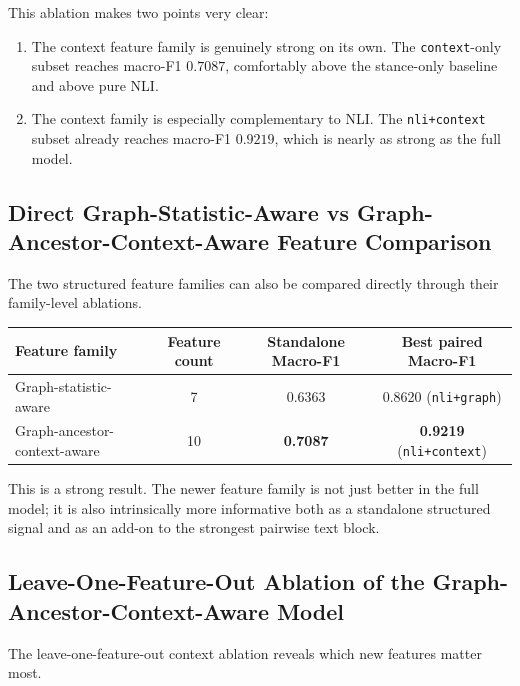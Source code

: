 \documentclass[11pt,a4paper]{article}
\begin{document}
This ablation makes two points very clear:
\begin{enumerate}[label=\arabic*.]
  \item The context feature family is genuinely strong on its own. The \texttt{context}-only subset reaches macro-F1 \(0.7087\), comfortably above the stance-only baseline and above pure NLI.
  \item The context family is especially complementary to NLI. The \texttt{nli+context} subset already reaches macro-F1 \(0.9219\), which is nearly as strong as the full model.
\end{enumerate}

\subsection{Direct Graph-Statistic-Aware vs Graph-Ancestor-Context-Aware Feature Comparison}
The two structured feature families can also be compared directly through their family-level ablations.

\begin{center}
\begin{tabular}{lccc}
\toprule
Feature family & Feature count & Standalone Macro-F1 & Best paired Macro-F1 \\
\midrule
Graph-statistic-aware & 7 & 0.6363 & 0.8620 (\texttt{nli+graph}) \\
Graph-ancestor-context-aware & 10 & \textbf{0.7087} & \textbf{0.9219} (\texttt{nli+context}) \\
\bottomrule
\end{tabular}
\end{center}

This is a strong result. The newer feature family is not just better in the full model; it is also intrinsically more informative both as a standalone structured signal and as an add-on to the strongest pairwise text block.

\subsection{Leave-One-Feature-Out Ablation of the Graph-Ancestor-Context-Aware Model}
The leave-one-feature-out context ablation reveals which new features matter most.
\end{document}
